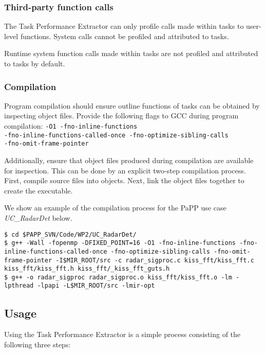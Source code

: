 \documentclass[11pt,a4paper]{article}
\begin{document}
\subsubsection{Third-party function calls}

The Task Performance Extractor can only profile calls made within tasks to user-level functions. System calls cannot be profiled and attributed to tasks. 

Runtime system function calls made within tasks are not profiled and attributed to tasks by default.

\subsubsection{Compilation}

Program compilation should ensure outline functions of tasks can be obtained by inspecting object files. Provide the following flags to GCC during program compilation:
\texttt{-O1 -fno-inline-functions \\ -fno-inline-functions-called-once -fno-optimize-sibling-calls \\ -fno-omit-frame-pointer}

Additionally, ensure that object files produced during compilation are available for inspection. This can be done by an explicit two-step compilation process. First, compile source files into objects. Next, link the object files together to create the executable.

We show an example of the compilation process for the PaPP use case \textit{UC\_RadarDet} below.

\begin{lstlisting}[style=MyInputStyle]
$ cd $PAPP_SVN/Code/WP2/UC_RadarDet/
$ g++ -Wall -fopenmp -DFIXED_POINT=16 -O1 -fno-inline-functions -fno-inline-functions-called-once -fno-optimize-sibling-calls -fno-omit-frame-pointer -I$MIR_ROOT/src -c radar_sigproc.c kiss_fft/kiss_fft.c kiss_fft/kiss_fft.h kiss_fft/_kiss_fft_guts.h 
$ g++ -o radar_sigproc radar_sigproc.o kiss_fft/kiss_fft.o -lm -lpthread -lpapi -L$MIR_ROOT/src -lmir-opt
\end{lstlisting}

\subsection{Usage}

Using the Task Performance Extractor is a simple process consisting of the following three steps:
\end{document}
